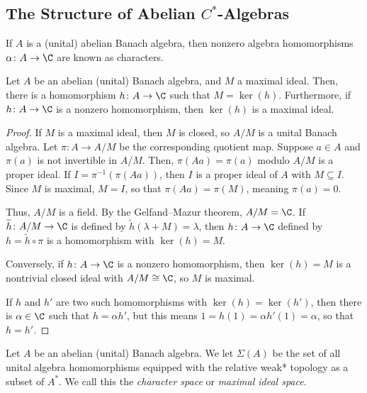 \documentclass[10pt]{mypackage}
\begin{document}
\subsection{The Structure of Abelian $C^{\ast}$-Algebras}%
\begin{definition}
  If $A$ is a (unital) abelian Banach algebra, then nonzero algebra homomorphisms $\alpha\colon A\rightarrow \C$ are known as characters.
\end{definition}
\begin{proposition}
  Let $A$ be an abelian (unital) Banach algebra, and $M$ a maximal ideal. Then, there is a homomorphism $h\colon A\rightarrow \C$ such that $M = \ker\left( h \right)$. Furthermore, if $h\colon A\rightarrow \C$ is a nonzero homomorphism, then $\ker\left( h \right)$ is a maximal ideal.
\end{proposition}
\begin{proof}
  If $M$ is a maximal ideal, then $M$ is closed, so $A/M$ is a unital Banach algebra. Let $\pi\colon A\rightarrow A/M$ be the corresponding quotient map. Suppose $a\in A$ and $\pi(a)$ is not invertible in $A/M$. Then, $\pi\left( Aa \right) = \pi(a)$ modulo $A/M$ is a proper ideal. If $I = \pi^{-1}\left( \pi(Aa) \right)$, then $I$ is a proper ideal of $A$ with $M\subseteq I$. Since $M$ is maximal, $M = I$, so that $\pi(Aa) = \pi(M)$, meaning $\pi(a) = 0$.

  Thus, $A/M$ is a field. By the Gelfand--Mazur theorem, $A/M = \C$. If $ \widetilde{h}\colon A/M\rightarrow \C $ is defined by $\widetilde{h}\left( \lambda + M \right) = \lambda$, then $h\colon A\rightarrow \C$ defined by $h = \widetilde{h}\circ \pi$ is a homomorphism with $\ker(h) = M$.

  Conversely, if $h\colon A\to\C$ is a nonzero homomorphism, then $\ker\left( h \right) = M$ is a nontrivial closed ideal with $A/M\cong \C$, so $M$ is maximal.

  If $h$ and $h'$ are two such homomorphisms with $\ker\left( h \right) = \ker\left( h' \right)$, then there is $\alpha\in \C$ such that $h = \alpha h'$, but this means $1 = h(1) = \alpha h'(1) = \alpha$, so that $h = h'$.
\end{proof}
\begin{definition}
  Let $A$ be an abelian (unital) Banach algebra. We let $\Sigma(A)$ be the set of all unital algebra homomorphisms equipped with the relative weak* topology as a subset of $A^{\ast}$. We call this the \textit{character space} or \textit{maximal ideal space}.
\end{definition}
\end{document}
